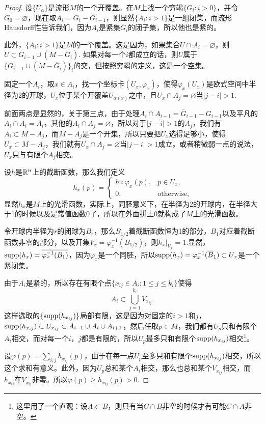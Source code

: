 \begin{proof}
设$\{U_{\alpha}\}$是流形$M$的一个开覆盖。在$M$上找一个穷竭$\{G_i:i>0\}$，并令$G_0=\varnothing$，现在取$A_i=\overline{G}_i-G_{i-1}$，则显然$\{A_i:i>1\}$是一组闭集，而流形Hausdorff性告诉我们，因为$A_i$是紧集$\overline{G}_i$的闭子集，所以他也是紧的。

此外，$\{A_i:i>1\}$是$M$的一个覆盖。这是因为，如果集合$U\cap A_i=\varnothing$，则$U\subset G_{i-1}\cup (M-\overline{G}_{i})$. 如果对每一个$i$都成立的话，则$U$属于$\{G_{i-1}\cup (M-\overline{G}_{i})\}_i$的交，但按照穷竭的定义，这是一个空集。

固定一个$A_i$，取$x\in A_i$，找一个坐标卡$(U_x,\varphi_x)$，使得$\varphi_x(U_x)$是欧式空间中半径为$2$的开球，$U_x$位于某个开覆盖$U_{\alpha(x)}$之中，且$U_x\cap A_j=\varnothing$当$|j-i|>1$.

前面两点是显然的，关于第三点，由于处理$A_i\cap A_{i-1}= \overline{G}_{i-1}-G_{i-1}$以及平凡的$A_i\cap A_i=A_i$，其他的$A_i\cap A_j=\varnothing$，所以对于$|j-i|>1$的$A_j$，我们有$A_i\subset M-A_j$，而$M-A_j$是一个开集，所以只要把$U_x$选得足够小，使得$U_x\subset M-A_j$，我们就有$U_x\cap A_j=\varnothing$当$|j-i|>1$成立。或者稍微弱一点的说法，$U_x$只与有限个$A_j$相交。

设$h$是$\mathbb{R}^n$上的截断函数，那么我们定义
\[
	h_x(p)=\begin{cases}h\circ \varphi_x(p),& p\in U_x,\\
	0,&\text{otherwise},
	\end{cases}
\]
显然$h_x$是$M$上的光滑函数，实际上，同胚意义下，在半径为2的开球内，在半径大于1的时候以及是常值函数0了，所以在外面拼上0就构成了$M$上的光滑函数。

令开球内半径为$r$的闭球为$B_r$，那么$B_{1/2}$着截断函数恒为1的部分，$B_{1}$对应着截断函数非零的部分，以及开集$V_x=\varphi_x^{-1}(B_{1/2})$，则$h_x|_{V_x}=1$.显然，$\operatorname{supp}(h_{x})=\overline{\varphi_x^{-1}(B_1)}$，因为$\varphi_x$是一个同胚，所以$\operatorname{supp}(h_{x})=\varphi_x^{-1}(\overline{B}_1)\subset U_x$是一个紧闭集。

由于$A_i$是紧的，所以存在有限个点$\{x_{ij}\in A_i:1\leq j\leq k_i\}$使得
\[
	A_i\subset \bigcup_{j=1}^{k_i}V_{x_{ij}}.
\]
这样选取的$\{\operatorname{supp}(h_{x_{ij}})\}$局部有限，这是因为对固定的$i>1$和$j$，$\operatorname{supp}(h_{x_{ij}})\subset U_{x_{ij}}\subset A_{i-1}\cup A_i\cup A_{i+1}$，然后任取$p\in M$，我们都有$U_p$只和有限个$A_i$相交，而对每一个$i$，$j$都是有限的，所以$U_p$最多只和有限个$\operatorname{supp}(h_{x_{ij}})$相交\footnote{这里用了一个直观：设$A\subset B$，则只有当$C\cap B$非空的时候才有可能$C\cap A$非空。}。

设$\varphi(p)=\sum_{i,j}h_{x_{ij}}(p)$，由于在每一点$U_p$至多只和有限个$\operatorname{supp}(h_{x_{ij}})$相交，所以这个求和有意义。此外，因为$U_p$总和某个$A_i$相交，那么也总和某个$V_{x_{ij}}$相交，而$h_{x_{ij}}$在$V_{x_{ij}}$非零。所以$\varphi(p)\geq h_{x_{ij}}(p)>0$.


\end{proof}
